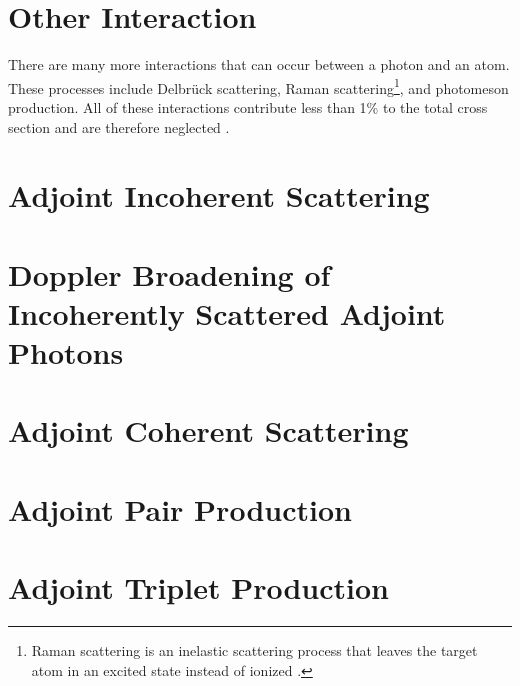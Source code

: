 \section{Other Interaction}
There are many more interactions that can occur between a photon and an atom.
These processes include Delbr\"{u}ck scattering, Raman scattering\footnote{Raman scattering is an inelastic scattering process that leaves the target atom in an excited state instead of ionized \citep{cullen_epdl97_1997}.}, and 
photomeson production. All of these interactions contribute less than 1\% to the
total cross section and are therefore neglected \citep{lux_monte_1991}.

\section{Adjoint Incoherent Scattering}

\section{Doppler Broadening of Incoherently Scattered Adjoint Photons}

\section{Adjoint Coherent Scattering}

\section{Adjoint Pair Production}

\section{Adjoint Triplet Production}
